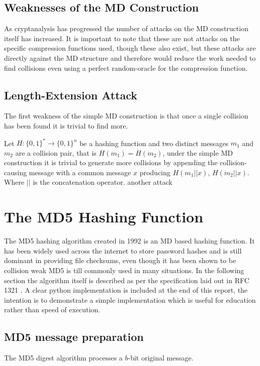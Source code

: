 \documentclass[a4paper,12pt]{article}
\begin{document}
\subsection{Weaknesses of the MD Construction}
As cryptanalysis has progressed the number of attacks on the MD construction itself has increased\cite{dobbertin}\cite{Xie2013}. It is important to note that these are not attacks on the specific compression functions used, though these also exist, but these attacks are directly against the MD structure and therefore would reduce the work needed to find collisions even using a perfect random-oracle for the compression function.

\subsection{Length-Extension Attack}
The first weakness of the simple MD construction is that once a single collision has been found it is trivial to find more\cite{Sasaki2006}. 

Let $H: \{0,1\}^* \rightarrow \{0,1\}^n$ be a hashing function and two distinct messages $m_1$ and $m_2$ are a collision pair, that is $H(m_1) = H(m_2)$, under the simple MD construction it is trivial to generate more collisions by appending the collision-causing message with a common message $x$ producing $H(m_1||x)$, $H(m_2||x)$.  Where $||$ is the concatenation operator.
{\color{red} another attack}



\label{sec:length}

\section{The MD5 Hashing Function}
The MD5 hashing algorithm\cite{Rivest} created in 1992 is an MD based hashing function. It has been widely used across the internet to store password hashes and is still dominant in providing file checksums, even though it has been shown to be collision weak MD5 is till commonly used in many situations. In the following section the algorithm itself is described as per the specification laid out in RFC 1321 \cite{Rivest}. A clear python implementation is included at the end of this report, the intention is to demonstrate a simple implementation which is useful for education rather than speed of execution.

\subsection{MD5 message preparation}
The MD5 digest algorithm processes a $b$-bit original message.
\end{document}
